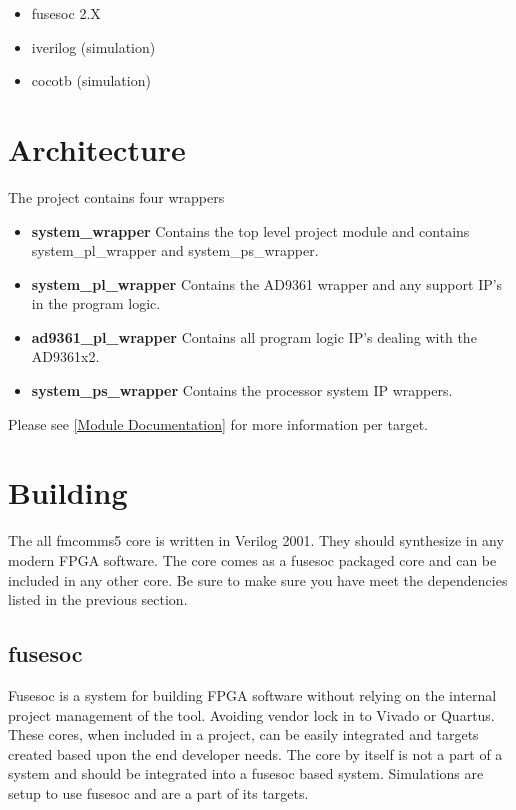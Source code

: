 \begin{itemize}
  \item fusesoc 2.X
  \item iverilog (simulation)
  \item cocotb (simulation)
\end{itemize}



\section{Architecture}
\par
The project contains four wrappers

\begin{itemize}
  \item \textbf{system\_wrapper} Contains the top level project module and contains system\_pl\_wrapper and system\_ps\_wrapper.
  \item \textbf{system\_pl\_wrapper} Contains the AD9361 wrapper and any support IP's in the program logic.
  \item \textbf{ad9361\_pl\_wrapper} Contains all program logic IP's dealing with the AD9361x2.
  \item \textbf{system\_ps\_wrapper} Contains the processor system IP wrappers.
\end{itemize}

\par

Please see \ref{Module Documentation} for more information per target.

\section{Building}

\par
The all fmcomms5 core is written in Verilog 2001. They should synthesize in any modern FPGA software. The core comes as a fusesoc packaged core and can be
included in any other core. Be sure to make sure you have meet the dependencies listed in the previous section.

\subsection{fusesoc}
\par
Fusesoc is a system for building FPGA software without relying on the internal project management of the tool. Avoiding vendor lock in to Vivado or Quartus.
These cores, when included in a project, can be easily integrated and targets created based upon the end developer needs. The core by itself is not a part of
a system and should be integrated into a fusesoc based system. Simulations are setup to use fusesoc and are a part of its targets.

